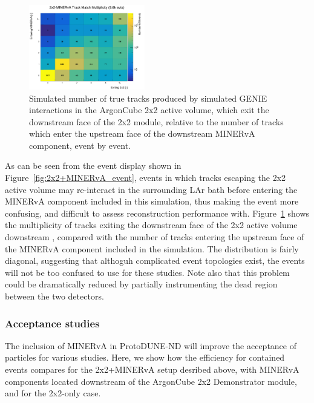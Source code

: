\begin{figure}[htb]
  \centering
  \includegraphics[width=0.45\textwidth]{plots/2x2_minerva_plots/track_mathch_topo.png}
  \caption{Simulated number of true tracks produced by simulated GENIE interactions in the ArgonCube 2x2 active volume, which exit the downstream face of the 2x2 module, relative to the number of tracks which enter the upstream face of the downstream MINERvA component, event by event.}
  \label{fig:track_multiplicity_topo}
\end{figure}
As can be seen from the event display shown in Figure~\ref{fig:2x2+MINERvA_event}, events in which tracks escaping the 2x2 active volume may re-interact in the surrounding LAr bath before entering the MINERvA component included in this simulation, thus making the event more confusing, and difficult to assess reconstruction performance with. Figure~\ref{fig:track_multiplicity_topo} shows the multiplicity of tracks exiting the downstream face of the 2x2 active volume downstream , compared with the number of tracks entering the upstream face of the MINERvA component included in the simulation. The distribution is fairly diagonal, suggesting that althoguh complicated event topologies exist, the events will not be too confused to use for these studies. Note also that this problem could be dramatically reduced by partially instrumenting the dead region between the two detectors.

\subsubsection{Acceptance studies}

The inclusion of MINERvA in ProtoDUNE-ND will improve the acceptance of particles for various studies. Here, we show how the efficiency for contained events compares for the 2x2+MINERvA setup desribed above, with MINERvA components located downstream of the ArgonCube 2x2 Demonstrator module, and for the 2x2-only case.

